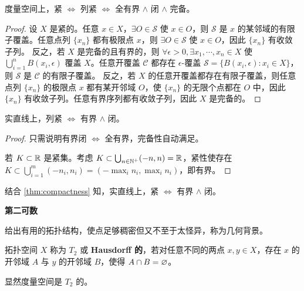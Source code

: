 \begin{theorem}\label{thm:compactness}
    度量空间上，紧 $\iff$ 列紧 $\iff$ 全有界 $\wedge$ 闭 $\wedge$ 完备。
\end{theorem}
\begin{proof}
    设 $X$ 是紧的。任意 $x\in X$，$\exists O\in\mathscr S$ 使 $x\in O$，则 $\mathscr S$ 是 $x$ 的某邻域的有限子覆盖。任意点列 $\{x_n\}$ 都有极限点 $x$，则 $\exists O\in\mathscr S$ 使 $x\in O$，因此 $\{x_n\}$ 有收敛子列。
    反之，若 $X$ 是完备的且有界的，则 $\forall \epsilon>0,\exists x_1,\cdots,x_n\in X$
    使 $\bigcup_{i=1}^n B(x_i,\epsilon)$ 覆盖 $X$。任意开覆盖 $\mathscr C$ 都存在 $\epsilon$-覆盖 $\mathscr S=\{B(x_i,\epsilon):x_i\in X\}$，则 $\mathscr S$ 是 $\mathscr C$ 的有限子覆盖。
    反之，若 $X$ 的任意开覆盖都存在有限子覆盖，则任意点列 $\{x_n\}$ 的极限点 $x$ 都有某开邻域 $O$，使 $\{x_n\}$ 的无限个点都在 $O$ 中，因此 $\{x_n\}$ 有收敛子列。任意有界序列都有收敛子列，因此 $X$ 是完备的。
\end{proof}

\begin{eg}
    实直线上，列紧 $\iff$ 有界 $\wedge$ 闭。
\end{eg}
\begin{proof}
    只需说明有界闭 $\iff$ 全有界，完备性自动满足。

    若 $K\subset \mathbb{R}$ 是紧集。考虑 $K\subset\bigcup_{n\in\mathbb{N}^+}(-n,n)=\mathbb{R}$，紧性使存在 $K\subset \bigcup_{i=1}^m(-n_i,n_i)=(-\max_i{n_i},\max_i{n_i})$，即有界。
\end{proof}

\begin{eg}
    结合 \ref{thm:compactness} 知，实直线上，紧 $\iff$ 有界 $\wedge$ 闭。
\end{eg}


\begin{definition}
    \textbf{第二可数}
\end{definition}
给出有用的拓扑结构，使点足够稠密但又不至于太怪异，称为几何背景。


\begin{definition}
    拓扑空间 $X$ 称为 $T_2$ 或 \textbf{Hausdorff 的}，若对任意不同的两点 $x,y \in X$，存在 $x$ 的开邻域 $A$ 与 $y$ 的开邻域 $B$，使得 $A \cap B=\varnothing$。
\end{definition}

\begin{theorem}
    显然度量空间是 $T_2$ 的。
\end{theorem}

